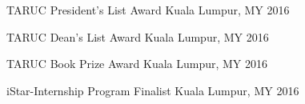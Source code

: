 




\begin{cvachs}
    \cvach
    {TARUC President's List Award} %
    {Kuala Lumpur, MY} %
    {2016} %

    \cvach
    {TARUC Dean's List Award} %
    {Kuala Lumpur, MY} %
    {2016} %

    \cvach
    {TARUC Book Prize Award} %
    {Kuala Lumpur, MY} %
    {2016} %


    \cvach
    {iStar-Internship Program Finalist} %
    {Kuala Lumpur, MY} %
    {2016} %
  \end{cvachs}
